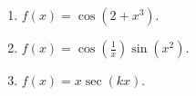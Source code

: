 \begin{multicols}{2}
\begin{enumerate}[ref={\fcProblemRef}]
\item $\displaystyle f(x)=\cos (2+x^3) $.

\item $\displaystyle f(x)=\cos \left(\frac{1}{x}\right) \sin (x^2)$.

\item $\displaystyle f(x)= x\sec (k x) $.


\end{enumerate}
\end{multicols}

